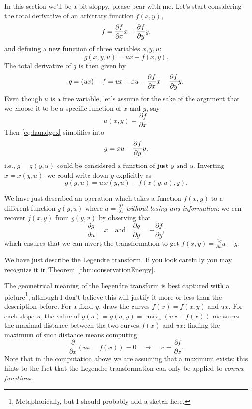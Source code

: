 \documentclass[english,fontsize=11pt,paper=a5,oneside]{scrbook}
\let\d\relax
\newcommand{\d}{\mathrm{d}}
\theoremstyle{definition}
\begin{document}
In this section we'll be a bit sloppy, please bear with me.
%
Let's start considering the total derivative of an arbitrary function $f(x,y)$,
\begin{equation}
  \d f = \frac{\partial f}{\partial x} \d x + \frac{\partial f}{\partial y} \d y,
\end{equation}
and defining a new function of three variables $x,y,u$:
\begin{equation}
  g(x,y,u) = ux - f(x,y).
\end{equation}
The total derivative of $g$ is then given by
\begin{equation}\label{eq:hamdgex}
  \d g = \d(ux) - \d f = u\d x + x \d u - \frac{\partial f}{\partial x} \d x - \frac{\partial f}{\partial y} \d y.
\end{equation}
Even though $u$ is a free variable, let's assume for the sake of the argument that we choose it to be a specific function of $x$  and $y$, say
\begin{equation}
  u(x,y) = \frac{\partial f}{\partial x}.
\end{equation}
Then \eqref{eq:hamdgex} simplifies into
\begin{equation}
  \d g = x \d u - \frac{\partial f}{\partial y} \d y,
\end{equation}
i.e., $g=g(y,u)$ could be considered a function of just $y$ and $u$.
Inverting $x = x(y,u)$, we could write down $g$ explicitly as
\begin{equation}
  g(y,u) = u\, x(y,u) - f(x(y, u), y).
\end{equation}

We have just described an operation which takes a function $f(x,y)$ to a different function $g(y,u)$ where $u = \frac{\partial f}{\partial x}$ \emph{without losing any information}: we can recover $f(x,y)$ from $g(y,u)$ by observing that
\begin{equation}
  \frac{\partial g}{\partial u} = x
  \quad\mbox{and}\quad
  \frac{\partial g}{\partial y} = - \frac{\partial f}{\partial y},
\end{equation}
which ensures that we can invert the transformation to get $f(x,y) = \frac{\partial g}{\partial u}u - g$.

We have just describe the Legendre transform.
If you look carefully you may recognize it in Theorem~\ref{thm:conservationEnergy}.

The geometrical meaning of the Legendre transform is best captured with a picture\footnote{Metaphorically, but I should probably add a sketch here.}, although I don't believe this will justify it more or less than the description before.
For a fixed $y$, draw the curves $f(x) = f(x,y)$ and $ux$.
For each slope $u$, the value of $g(u) = g(u,y) = \max_x (ux - f(x))$ measures the maximal distance between the two curves $f(x)$ and $ux$: finding the maximum of such distance means
computing
\begin{equation}
  \frac{\partial}{\partial x}(ux - f(x)) = 0 \quad\Rightarrow\quad u = \frac{\partial f}{\partial x}.
\end{equation}
Note that in the computation above we are assuming that a maximum exists:
this hints to the fact that the Legendre transformation can only be applied to \emph{convex functions}.
\end{document}

